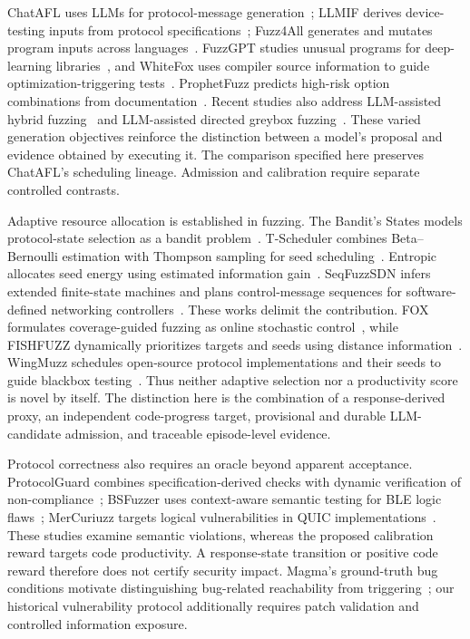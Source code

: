 \documentclass[final,5p,times,number]{elsarticle}
\begin{document}
ChatAFL uses LLMs for protocol-message generation~\cite{chatafl}; LLMIF derives device-testing inputs from protocol specifications~\cite{llmif_augmented_large_language_2024}; Fuzz4All generates and mutates program inputs across languages~\cite{fuzz4all_universal_fuzzing_large_2024}. FuzzGPT studies unusual programs for deep-learning libraries~\cite{fuzzgpt2024}, and WhiteFox uses compiler source information to guide optimization-triggering tests~\cite{whitefox2024}. ProphetFuzz predicts high-risk option combinations from documentation~\cite{prophetfuzz2024}. Recent studies also address LLM-assisted hybrid fuzzing~\cite{hybridllm2026} and LLM-assisted directed greybox fuzzing~\cite{hgfuzzer2026}. These varied generation objectives reinforce the distinction between a model's proposal and evidence obtained by executing it. The comparison specified here preserves ChatAFL's scheduling lineage. Admission and calibration require separate controlled contrasts.

Adaptive resource allocation is established in fuzzing. The Bandit's States models protocol-state selection as a bandit problem~\cite{bandits_states2023}. T-Scheduler combines Beta--Bernoulli estimation with Thompson sampling for seed scheduling~\cite{tscheduler2024}. Entropic allocates seed energy using estimated information gain~\cite{entropic2020}. SeqFuzzSDN infers extended finite-state machines and plans control-message sequences for software-defined networking controllers~\cite{seqfuzzsdn2026}. These works delimit the contribution. FOX formulates coverage-guided fuzzing as online stochastic control~\cite{fox2024}, while FISHFUZZ dynamically prioritizes targets and seeds using distance information~\cite{fishfuzz2023}. WingMuzz schedules open-source protocol implementations and their seeds to guide blackbox testing~\cite{wingmuzz2025}. Thus neither adaptive selection nor a productivity score is novel by itself. The distinction here is the combination of a response-derived proxy, an independent code-progress target, provisional and durable LLM-candidate admission, and traceable episode-level evidence.

Protocol correctness also requires an oracle beyond apparent acceptance. ProtocolGuard combines specification-derived checks with dynamic verification of non-compliance~\cite{protocolguard2026}; BSFuzzer uses context-aware semantic testing for BLE logic flaws~\cite{bsfuzzer2026}; MerCuriuzz targets logical vulnerabilities in QUIC implementations~\cite{mercuriuzz2026}. These studies examine semantic violations, whereas the proposed calibration reward targets code productivity. A response-state transition or positive code reward therefore does not certify security impact. Magma's ground-truth bug conditions motivate distinguishing bug-related reachability from triggering~\cite{magma2020}; our historical vulnerability protocol additionally requires patch validation and controlled information exposure.
\end{document}
